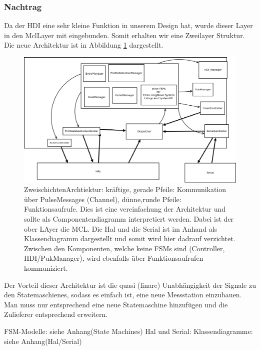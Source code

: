 \documentclass[
   draft=false
  ,paper=a4
  ,twoside=true
  ,fontsize=11pt
  ,headsepline
  ,DIV11
  ,parskip=full+
]{scrartcl} %
\begin{document}
\subsubsection{Nachtrag}
Da der HDI eine sehr kleine Funktion in unserem Design hat, wurde dieser Layer in den MclLayer mit eingebunden. 
Somit erhalten wir eine Zweilayer Struktur.
Die neue Architektur ist in Abbildung \ref{fig:newArch} dargestellt.

\begin{figure}[htp]
  	\centering
    \includegraphics[width=\textwidth]{./IMG/newArch.png}
    \caption[neue Zweischichten Arch]{ZweischichtenArchtiektur: kräftige, gerade Pfeile: Kommunikation über PulseMessages (Channel), dünne,runde Pfeile: Funktionsaufrufe. Dies ist eine vereinfachung der Architektur und sollte als Componentendiagramm interpretiert werden. Dabei ist der ober LAyer die MCL. Die Hal und die Serial ist im Anhand als Klassendiagramm dargestellt und somit wird hier dadrauf verzichtet. Zwischen den Komponenten, welche keine FSMs sind (Controller, HDI/PukManager), wird ebenfalls über Funktionsaufrufen kommuniziert. }
     \label{fig:newArch}
\end{figure}

Der Vorteil dieser Architektur ist die quasi (linare) Unabhängigkeit der Signale zu den Statemaschienes, sodass es einfach ist, eine neue Messstation einzubauen.
Man muss nur entsprechend eine neue Statemaschine  hinzufügen und die Zulieferer entsprechend erweitern.

FSM-Modelle: siehe Anhang(State Machines)
Hal und Serial: Klassendiagramme: siehe Anhang(Hal/Serial)
\end{document}
